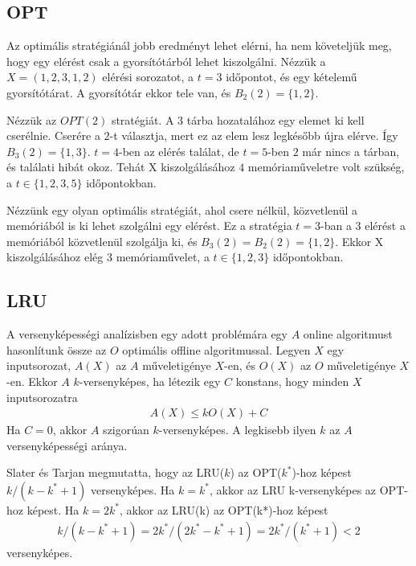 \documentclass[12pt]{report}
\begin{document}
\subsection{OPT}

Az optimális stratégiánál jobb eredményt lehet elérni,
ha nem követeljük meg, hogy egy elérést csak a gyorsítótárból lehet kiszolgálni.
Nézzük a $X=(1, 2, 3, 1, 2)$ elérési sorozatot, a $t=3$ időpontot,
és egy kételemű gyorsítótárat.
A gyorsítótár ekkor tele van, és $B_2(2) = \{1, 2\}$.

Nézzük az $OPT(2)$ stratégiát.
A $3$ tárba hozatalához egy elemet ki kell cserélnie.
Cserére a $2$-t választja, mert ez az elem lesz legkésőbb újra elérve.
Így $B_3(2) = \{1, 3\}$.
$t=4$-ben az elérés találat,
de $t=5$-ben $2$ már nincs a tárban, és találati hibát okoz.
Tehát X kiszolgálásához $4$ memóriaműveletre volt szükség,
a $t \in \{1, 2, 3, 5\}$ időpontokban.

Nézzünk egy olyan optimális stratégiát,
ahol csere nélkül, közvetlenül a memóriából is
ki lehet szolgálni egy elérést.
Ez a stratégia $t=3$-ban a $3$ elérést a memóriából közvetlenül szolgálja ki,
és $B_3(2) = B_2(2) = \{1, 2\}$.
Ekkor X kiszolgálásához elég $3$ memóriaművelet,
a $t \in \{1, 2, 3\}$ időpontokban.

\subsection{LRU}

A versenyképességi analízisben egy adott problémára
egy $A$ online algoritmust hasonlítunk össze 
az $O$ optimális offline algoritmussal.
Legyen $X$ egy inputsorozat,
$A(X)$ az $A$ műveletigénye $X$-en,
és $O(X)$ az $O$ műveletigénye $X$-en.
Ekkor $A$ $k$-versenyképes\cite{competetive-analysis}, ha létezik egy $C$ konstans,
hogy minden $X$ inputsorozatra
\begin{align*}
A(X) \le kO(X)+C
\end{align*}
Ha $C=0$, akkor $A$ szigorúan $k$-versenyképes. A legkisebb ilyen $k$ az $A$ versenyképességi aránya.

Slater és Tarjan\cite{lru-k-competetive} megmutatta,
hogy az LRU($k$) az OPT($k^*$)-hoz képest $k/(k-k^*+1)$ versenyképes.
Ha $k=k^*$, akkor az LRU k-versenyképes az OPT-hoz képest.
Ha $k=2k^*$, akkor az LRU(k) az OPT(k*)-hoz képest
\begin{align*}
k/(k-k^*+1) = 2k^*/(2k^*-k^*+1) = 2k^*/(k^*+1) < 2
\end{align*}
versenyképes\cite{prokop}.
\end{document}
